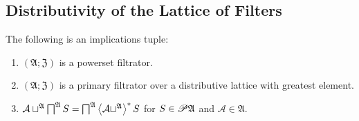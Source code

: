 \subsection{Distributivity of the Lattice of Filters}
\begin{thm}
\label{f-inf-assc}The following is an implications tuple:
\begin{enumerate}
\item \label{inf-assc-p}$(\mathfrak{A};\mathfrak{Z})$ is a powerset filtrator.
\item \label{inf-assc-prim}$(\mathfrak{A};\mathfrak{Z})$ is a primary
filtrator over a distributive lattice with greatest element.
\item \label{inf-assc-conc}$\mathcal{A}\sqcup^{\mathfrak{A}}\bigsqcap^{\mathfrak{A}}S=\bigsqcap^{\mathfrak{A}}\left\langle \mathcal{A}\sqcup^{\mathfrak{A}}\right\rangle ^{\ast}S$
for $S\in\mathscr{P}\mathfrak{A}$ and $\mathcal{A}\in\mathfrak{A}$.
\end{enumerate}
\end{thm}
